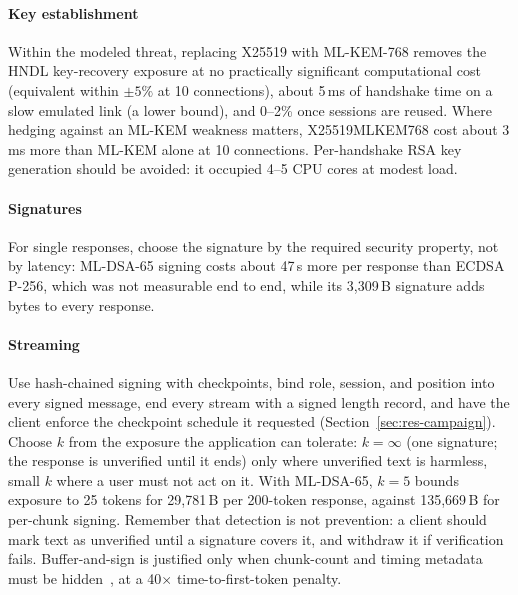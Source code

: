 \documentclass[conference]{IEEEtran}
\begin{document}
\paragraph*{Key establishment} Within the modeled threat, replacing X25519 with ML-KEM-768 removes the HNDL
key-recovery exposure at no practically significant computational cost (equivalent within $\pm5\%$ at 10
connections), about 5\,ms of handshake time on a slow emulated link (a lower bound), and 0--2\% once
sessions are reused. Where hedging against an ML-KEM weakness matters, X25519MLKEM768 cost about 3\,ms more
than ML-KEM alone at 10 connections. Per-handshake RSA key generation should be avoided: it occupied 4--5
CPU cores at modest load.

\paragraph*{Signatures} For single responses, choose the signature by the required security property,
not by latency: ML-DSA-65 signing costs about 47\,\textmu s more per response than ECDSA P-256, which was
not measurable end to end, while its 3,309\,B signature adds bytes to every response.

\paragraph*{Streaming} Use hash-chained signing with checkpoints, bind role, session, and position into
every signed message, end every stream with a signed length record, and have the client enforce the
checkpoint schedule it requested (Section~\ref{sec:res-campaign}). Choose $k$ from the exposure the
application can tolerate: $k{=}\infty$ (one signature; the response is unverified until it ends) only where
unverified text is harmless, small $k$ where a user must not act on it. With ML-DSA-65, $k{=}5$ bounds
exposure to 25 tokens for 29,781\,B per 200-token response, against 135,669\,B for per-chunk signing.
Remember that detection is not prevention: a client should mark text as unverified until a signature
covers it, and withdraw it if verification fails. Buffer-and-sign is justified only when chunk-count and
timing metadata must be hidden~\cite{weiss2024keylogging}, at a 40$\times$ time-to-first-token penalty.
\end{document}
